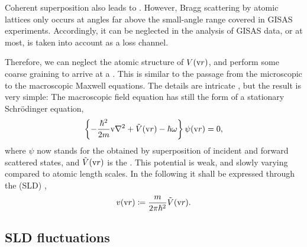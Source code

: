 Coherent superposition also leads to .
%
However, Bragg scattering by atomic lattices only occurs at angles
far above the small-angle range covered in GISAS experiments.
Accordingly, it can be neglected in the analysis of GISAS data,
or at most, is taken into account as a loss channel.

Therefore,
we can neglect the atomic structure of $V(\text{v}{r})$,
and perform some coarse graining to
arrive at a .
%
This is
similar to the passage from
the microscopic to the macroscopic Maxwell equations.
The details are intricate \cite{Sea89,Lax51},
but the result \cite[eq.~2.8.32]{Sea89} is very simple:
The macroscopic field equation
has still the form of a stationary Schrödinger equation,
%
\begin{equation}\label{EmacrSchrodi}
  \left\{-\frac{\hbar^2}{2m}\text{v}{\nabla}^2+\tilde{V}(\text{v}{r})-\hbar\omega\right\} \psi(\text{v}{r}) = 0,
\end{equation}
%
%
where $\psi$ now stands for the 
%
%
obtained by superposition of
incident and forward scattered states,
and $\tilde{V}(\text{v}{r})$ is the .
%
This potential is weak, and slowly varying compared to atomic length scales.
In the following it shall be expressed through the
 (SLD)
%
%
%
\cite[eq.\ 2.8.37]{Sea89},
%
\begin{equation}
  v(\text{v}{r})\coloneqq\frac{m}{2\pi \hbar^2}\tilde{V}(\text{v}{r}).
\end{equation}

\subsection{SLD fluctuations}\label{Sfluct}


